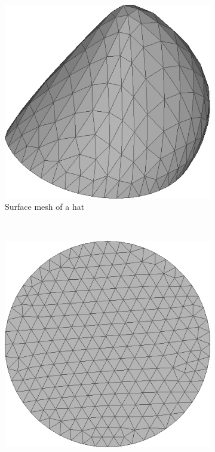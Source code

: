 \documentclass{article} %
\begin{document}
\begin{figure}[h!]
        \centering
        \begin{subfigure}[b]{0.4\textwidth}
                \includegraphics[width=\textwidth]{f1a.png}
                \caption{Surface mesh of a hat}
                \label{fig:pargraph}
        \end{subfigure} \\
        \begin{subfigure}[b]{0.4\textwidth}
                \includegraphics[width=\textwidth]{f1c.png}

\end{subfigure}
\end{figure}
\end{document}
